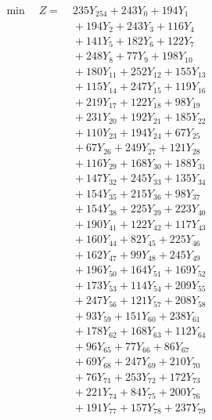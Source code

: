 \documentclass[a4paper,10pt]{article}
\begin{document}
\allowdisplaybreaks
{\small
\begin{align}
\min \quad Z = &\; 235 Y_{254} + 243 Y_{0} + 194 Y_{1} \\[0.3ex]
&\;  + 194 Y_{2} + 243 Y_{3} + 116 Y_{4} \\[0.3ex]
&\;  + 141 Y_{5} + 182 Y_{6} + 122 Y_{7} \\[0.3ex]
&\;  + 248 Y_{8} + 77 Y_{9} + 198 Y_{10} \\[0.3ex]
&\;  + 180 Y_{11} + 252 Y_{12} + 155 Y_{13} \\[0.3ex]
&\;  + 115 Y_{14} + 247 Y_{15} + 119 Y_{16} \\[0.3ex]
&\;  + 219 Y_{17} + 122 Y_{18} + 98 Y_{19} \\[0.3ex]
&\;  + 231 Y_{20} + 192 Y_{21} + 185 Y_{22} \\[0.3ex]
&\;  + 110 Y_{23} + 194 Y_{24} + 67 Y_{25} \\[0.3ex]
&\;  + 67 Y_{26} + 249 Y_{27} + 121 Y_{28} \\[0.5ex]\allowbreak
&\;  + 116 Y_{29} + 168 Y_{30} + 188 Y_{31} \\[0.3ex]
&\;  + 147 Y_{32} + 245 Y_{33} + 135 Y_{34} \\[0.3ex]
&\;  + 154 Y_{35} + 215 Y_{36} + 98 Y_{37} \\[0.3ex]
&\;  + 154 Y_{38} + 225 Y_{39} + 223 Y_{40} \\[0.3ex]
&\;  + 190 Y_{41} + 122 Y_{42} + 117 Y_{43} \\[0.3ex]
&\;  + 160 Y_{44} + 82 Y_{45} + 225 Y_{46} \\[0.3ex]
&\;  + 162 Y_{47} + 99 Y_{48} + 245 Y_{49} \\[0.3ex]
&\;  + 196 Y_{50} + 164 Y_{51} + 169 Y_{52} \\[0.3ex]
&\;  + 173 Y_{53} + 114 Y_{54} + 209 Y_{55} \\[0.3ex]
&\;  + 247 Y_{56} + 121 Y_{57} + 208 Y_{58} \\[0.5ex]\allowbreak
&\;  + 93 Y_{59} + 151 Y_{60} + 238 Y_{61} \\[0.3ex]
&\;  + 178 Y_{62} + 168 Y_{63} + 112 Y_{64} \\[0.3ex]
&\;  + 96 Y_{65} + 77 Y_{66} + 86 Y_{67} \\[0.3ex]
&\;  + 69 Y_{68} + 247 Y_{69} + 210 Y_{70} \\[0.3ex]
&\;  + 76 Y_{71} + 253 Y_{72} + 172 Y_{73} \\[0.3ex]
&\;  + 221 Y_{74} + 84 Y_{75} + 200 Y_{76} \\[0.3ex]
&\;  + 191 Y_{77} + 157 Y_{78} + 237 Y_{79} \\[0.3ex]

\end{align}}
\end{document}
